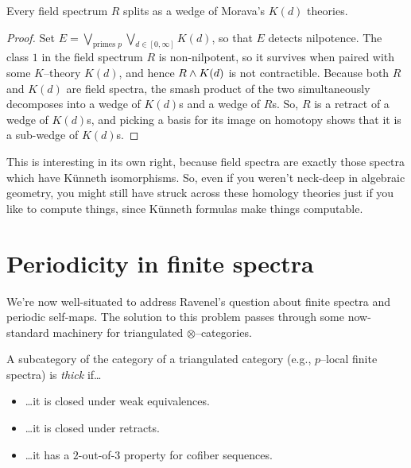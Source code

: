 \begin{corollary}
Every field spectrum $R$ splits as a wedge of Morava's $K(d)$ theories.
\end{corollary}
\begin{proof}
Set $E = \bigvee_{\text{primes $p$}} \bigvee_{d \in [0, \infty]} K(d)$, so that $E$ detects nilpotence.  The class $1$ in the field spectrum $R$ is non-nilpotent, so it survives when paired with some $K$--theory $K(d)$, and hence $R \wedge K(d)$ is not contractible.  Because both $R$ and $K(d)$ are field spectra, the smash product of the two simultaneously decomposes into a wedge of $K(d)$s and a wedge of $R$s.  So, $R$ is a retract of a wedge of $K(d)$s, and picking a basis for its image on homotopy shows that it is a sub-wedge of $K(d)$s.
\end{proof}

\begin{remark}
This is interesting in its own right, because field spectra are exactly those spectra which have K\"unneth isomorphisms.  So, even if you weren't neck-deep in algebraic geometry, you might still have struck across these homology theories just if you like to compute things, since K\"unneth formulas make things computable.
\end{remark}







\section{Periodicity in finite spectra}

We're now well-situated to address Ravenel's question about finite spectra and periodic self-maps.  The solution to this problem passes through some now-standard machinery for triangulated $\otimes$--categories.

\begin{definition}
A subcategory of the category of a triangulated category (e.g., $p$--local finite spectra) is \textit{thick} if\ldots{} 
\begin{itemize}
\item \ldots it is closed under weak equivalences.
\item \ldots it is closed under retracts.
\item \ldots it has a $2$-out-of-$3$ property for cofiber sequences.
\end{itemize}
\end{definition}

